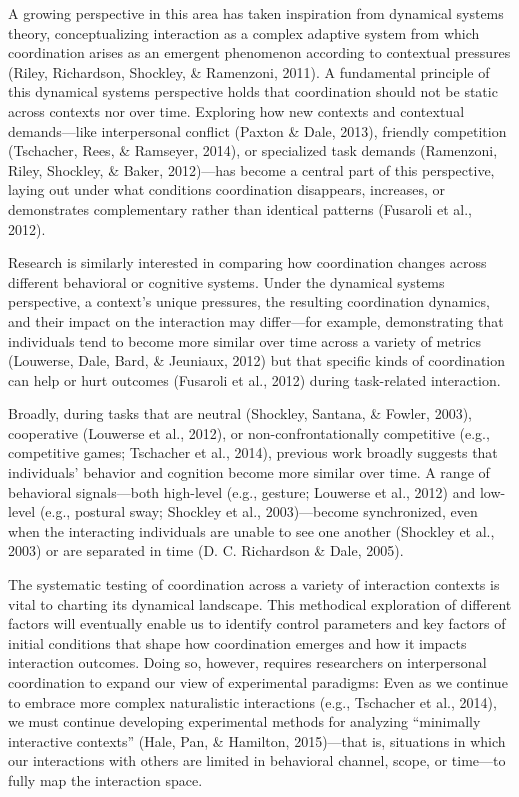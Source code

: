 \documentclass[10pt, letterpaper]{article}
\begin{document}
A growing perspective in this area has taken inspiration from dynamical
systems theory, conceptualizing interaction as a complex adaptive system
from which coordination arises as an emergent phenomenon according to
contextual pressures (Riley, Richardson, Shockley, \& Ramenzoni, 2011).
A fundamental principle of this dynamical systems perspective holds that
coordination should not be static across contexts nor over time.
Exploring how new contexts and contextual demands---like interpersonal
conflict (Paxton \& Dale, 2013), friendly competition (Tschacher, Rees,
\& Ramseyer, 2014), or specialized task demands (Ramenzoni, Riley,
Shockley, \& Baker, 2012)---has become a central part of this
perspective, laying out under what conditions coordination disappears,
increases, or demonstrates complementary rather than identical patterns
(Fusaroli et al., 2012).

Research is similarly interested in comparing how coordination changes
across different behavioral or cognitive systems. Under the dynamical
systems perspective, a context's unique pressures, the resulting
coordination dynamics, and their impact on the interaction may
differ---for example, demonstrating that individuals tend to become more
similar over time across a variety of metrics (Louwerse, Dale, Bard, \&
Jeuniaux, 2012) but that specific kinds of coordination can help or hurt
outcomes (Fusaroli et al., 2012) during task-related interaction.

Broadly, during tasks that are neutral (Shockley, Santana, \& Fowler,
2003), cooperative (Louwerse et al., 2012), or non-confrontationally
competitive (e.g., competitive games; Tschacher et al., 2014), previous
work broadly suggests that individuals' behavior and cognition become
more similar over time. A range of behavioral signals---both high-level
(e.g., gesture; Louwerse et al., 2012) and low-level (e.g., postural
sway; Shockley et al., 2003)---become synchronized, even when the
interacting individuals are unable to see one another (Shockley et al.,
2003) or are separated in time (D. C. Richardson \& Dale, 2005).

The systematic testing of coordination across a variety of interaction
contexts is vital to charting its dynamical landscape. This methodical
exploration of different factors will eventually enable us to identify
control parameters and key factors of initial conditions that shape how
coordination emerges and how it impacts interaction outcomes. Doing so,
however, requires researchers on interpersonal coordination to expand
our view of experimental paradigms: Even as we continue to embrace more
complex naturalistic interactions (e.g., Tschacher et al., 2014), we
must continue developing experimental methods for analyzing ``minimally
interactive contexts'' (Hale, Pan, \& Hamilton, 2015)---that is,
situations in which our interactions with others are limited in
behavioral channel, scope, or time---to fully map the interaction space.
\end{document}
